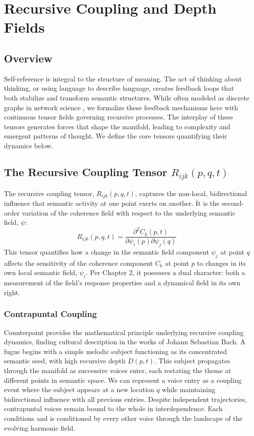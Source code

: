 \chapter{Recursive Coupling and Depth Fields}

\section{Overview}

Self-reference is integral to the structure of meaning. The act of thinking about thinking, or using language to describe language, creates feedback loops that both stabilize and transform semantic structures. While often modeled as discrete graphs in network science \autocite{Barabasi2016}, we formalize these feedback mechanisms here with continuous tensor fields governing recursive processes. The interplay of these tensors generates forces that shape the manifold, leading to complexity and emergent patterns of thought. We define the core tensors quantifying their dynamics below.

\section{\texorpdfstring{The Recursive Coupling Tensor $R_{ijk}(p, q, t)$}{The Recursive Coupling Tensor R_ijk(p, q, t)}}

The recursive coupling tensor, \(R_{ijk}(p, q, t)\), captures the non-local, bidirectional influence that semantic activity at one point exerts on another. It is the second-order variation of the coherence field with respect to the underlying semantic field, \(\psi\):
\begin{equation}
R_{ijk}(p, q, t) = \frac{\partial^2 C_k(p,t)}{\partial \psi_i(p) \partial \psi_j(q)}
\end{equation}
This tensor quantifies how a change in the semantic field component \(\psi_j\) at point \(q\) affects the sensitivity of the coherence component \(C_k\) at point \(p\) to changes in its own local semantic field, \(\psi_i\). Per Chapter 2, it possesses a dual character: both a measurement of the field's response properties and a dynamical field in its own right.

\subsection{Contrapuntal Coupling}

Counterpoint provides the mathematical principle underlying recursive coupling dynamics, finding cultural description in the works of Johann Sebastian Bach. A fugue begins with a simple melodic subject functioning as its concentrated semantic seed, with high recursive depth \(D(p,t)\). This subject propagates through the manifold as successive voices enter, each restating the theme at different points in semantic space. We can represent a voice entry as a coupling event where the subject appears at a new location \(q\) while maintaining bidirectional influence with all previous entries. Despite independent trajectories, contrapuntal voices remain bound to the whole in interdependence. Each conditions and is conditioned by every other voice through the landscape of the evolving harmonic field.

